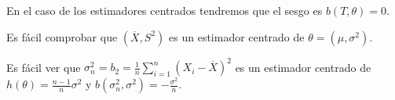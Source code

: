 \begin{observation}
En el caso de los estimadores centrados tendremos que el sesgo es $\displaystyle b\left(T, \theta\right)=0 $. 
\end{observation}
\begin{eg}
Es fácil comprobar que $\displaystyle \left(\overline{X}, S^{2}\right) $ es un estimador centrado de $\displaystyle \theta=\left(\mu, \sigma^{2}\right) $. 
\end{eg}
\begin{eg}
Es fácil ver que $\displaystyle \sigma^{2}_{n}=b_{2}=\frac{1}{n}\sum^{n}_{i= 1}\left(X_{i}-\overline{X}\right)^{2} $ es un estimador centrado de $\displaystyle h\left(\theta\right)=\frac{n-1}{n}\sigma^{2} $ y $\displaystyle b\left(\sigma_{n}^{2}, \sigma^{2}\right)=-\frac{\sigma^{2}}{n} $. 
\end{eg}
